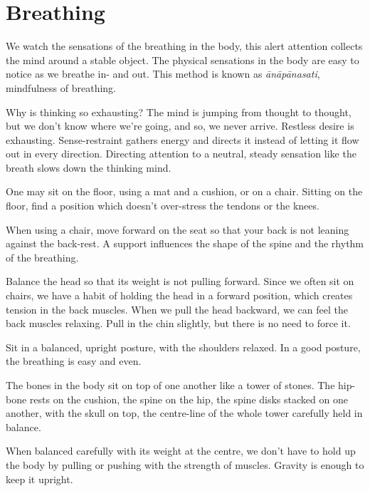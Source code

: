 \chapter{Breathing}


\noindent We watch the sensations of the breathing in the body, this
alert attention collects the mind around a stable object. The physical
sensations in the body are easy to notice as we breathe in- and out.
This method is known as \emph{ānāpānasati}, mindfulness of breathing.

Why is thinking so exhausting? The mind is jumping from thought to
thought, but we don't know where we're going, and so, we never arrive.
Restless desire is exhausting. Sense-restraint gathers energy and
directs it instead of letting it flow out in every direction. Directing
attention to a neutral, steady sensation like the breath slows down the
thinking mind.

One may sit on the floor, using a mat and a cushion, or on a chair.
Sitting on the floor, find a position which doesn't over-stress the
tendons or the knees.

When using a chair, move forward on the seat so that your back is not
leaning against the back-rest. A support influences the shape of the
spine and the rhythm of the breathing.

\enlargethispage*{\baselineskip}

Balance the head so that its weight is not pulling forward. Since we
often sit on chairs, we have a habit of holding the head in a forward
position, which creates tension in the back muscles. When we pull the
head backward, we can feel the back muscles relaxing. Pull in the chin
slightly, but there is no need to force it.

\clearpage
\thispagestyle{empty}\mbox{}
\clearpage

Sit in a balanced, upright posture, with the shoulders relaxed. In a
good posture, the breathing is easy and even.

The bones in the body sit on top of one another like a tower of stones.
The hip-bone rests on the cushion, the spine on the hip, the spine disks
stacked on one another, with the skull on top, the centre-line of the
whole tower carefully held in balance.

When balanced carefully with its weight at the centre, we don't have to
hold up the body by pulling or pushing with the strength of muscles.
Gravity is enough to keep it upright.

